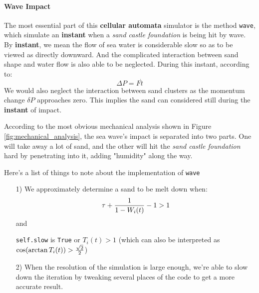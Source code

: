 \documentclass[12pt]{article}
\begin{document}
\paragraph{Wave Impact}
The most essential part of this \textbf{cellular automata} simulator is the method \texttt{wave}, which simulate an \textbf{instant} when a \textit{sand castle foundation} is being hit by wave. By \textbf{instant}, we mean the flow of sea water is considerable slow so as to be viewed as directly downward. And the complicated interaction between sand shape and water flow is also able to be neglected. During this instant, according to:
$$
    \varDelta P = {F} \dot {t}
$$
We would also neglect the interaction between sand clusters as the momentum change $\delta P$ approaches zero. This implies the sand can considered still during the \textbf{instant} of impact.
\par
According to the most obvious mechanical analysis shown in Figure \ref{fig:mechanical_analysis}, the sea wave's impact is separated into two parts. One will take away a lot of sand, and the other will hit the \textit{sand castle foundation} hard by penetrating into it, adding "humidity" along the way.
\par
Here's a list of things to note about the implementation of \texttt{wave}
\begin{itemize}
    \item [1)]
          We approximately determine a sand to be melt down when:
          $$
              \tau + {{1}\over{1-W_i(t)}} - 1 > 1
          $$
          and\par
          \texttt{self.slow} is \texttt{True} or $T_i(t) > 1$ (which can also be interpreted as $\cos(\arctan{T_i(t)}) > {\sqrt{2} \over 2}$)
    \item [2)]
          When the resolution of the simulation is large enough, we're able to slow down the iteration by tweaking several places of the code to get a more accurate result.
\end{itemize}
\end{document}
